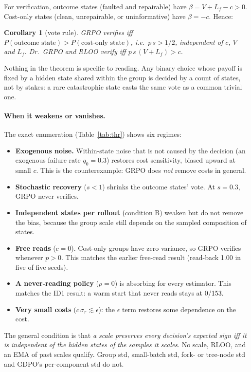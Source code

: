 \documentclass[11pt]{article}
\newtheorem{corollary}{Corollary}
\begin{document}
For verification, outcome states (faulted and repairable) have $\beta=V+L_f-c>0$. Cost-only states (clean,
unrepairable, or uninformative) have $\beta=-c$. Hence:

\begin{corollary}[vote rule]
GRPO verifies iff $P(\text{outcome state})>P(\text{cost-only state})$, i.e.\ $p\,s>1/2$, independent of $c$, $V$ and
$L_f$. Dr.~GRPO and RLOO verify iff $p\,s\,(V+L_f)>c$.
\end{corollary}

Nothing in the theorem is specific to reading. Any binary choice whose payoff is fixed by a hidden state shared within
the group is decided by a count of states, not by stakes: a rare catastrophic state casts the same vote as a common
trivial one.

\paragraph{When it weakens or vanishes.} The exact enumeration (Table~\ref{tab:thr}) shows six regimes:
\begin{itemize}
\item \textbf{Exogenous noise.} Within-state noise that is not caused by the decision (an exogenous failure rate
$q_0=0.3$) restores cost sensitivity, biased upward at small $c$. This is the counterexample: GRPO does \emph{not}
remove costs in general.
\item \textbf{Stochastic recovery} ($s<1$) shrinks the outcome states' vote. At $s=0.3$, GRPO never verifies.
\item \textbf{Independent states per rollout} (condition B) weaken but do not remove the bias, because the group
scale still depends on the sampled composition of states.
\item \textbf{Free reads} ($c=0$). Cost-only groups have zero variance, so GRPO verifies whenever $p>0$. This
matches the earlier free-read result (read-back 1.00 in five of five seeds).
\item \textbf{A never-reading policy} ($\rho=0$) is absorbing for every estimator. This matches the ID1 result: a
warm start that never reads stays at 0/153.
\item \textbf{Very small costs} ($c\,\sigma_r\lesssim\epsilon$): the $\epsilon$ term restores some dependence on the
cost.
\end{itemize}
The general condition is that \emph{a scale preserves every decision's expected sign iff it is independent of the
hidden states of the samples it scales}. No scale, RLOO, and an EMA of past scales qualify. Group std, small-batch
std, fork- or tree-node std and GDPO's per-component std \citep{liu2026gdpo} do not.
\end{document}
